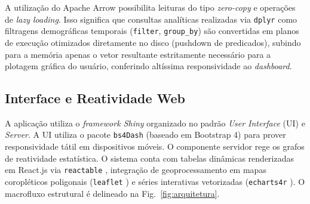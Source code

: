 \documentclass[10pt,conference]{IEEEtran}
\begin{document}
A utilização do Apache Arrow possibilita leituras do tipo \textit{zero-copy} e operações de \textit{lazy loading}. Isso significa que consultas analíticas realizadas via \texttt{dplyr} \cite{dplyr2026} como filtragens demográficas temporais (\texttt{filter}, \texttt{group\_by}) são convertidas em planos de execução otimizados diretamente no disco (pushdown de predicados), subindo para a memória apenas o vetor resultante estritamente necessário para a plotagem gráfica do usuário, conferindo altíssima responsividade ao \textit{dashboard}.

\subsection{Interface e Reatividade Web}

A aplicação utiliza o \textit{framework Shiny} organizado no padrão \textit{User Interface} (UI) e \textit{Server}. A UI utiliza o pacote \texttt{bs4Dash} (baseado em Bootstrap 4) para prover responsividade tátil em dispositivos móveis. O componente servidor rege os grafos de reatividade estatística. O sistema conta com tabelas dinâmicas renderizadas em React.js via \texttt{reactable} \cite{reactable2026}, integração de geoprocessamento em mapas coropléticos poligonais (\texttt{leaflet} \cite{leaflet2025}) e séries interativas vetorizadas (\texttt{echarts4r} \cite{echarts4r2026}). O macrofluxo estrutural é delineado na Fig.~\ref{fig:arquitetura}.
\end{document}
